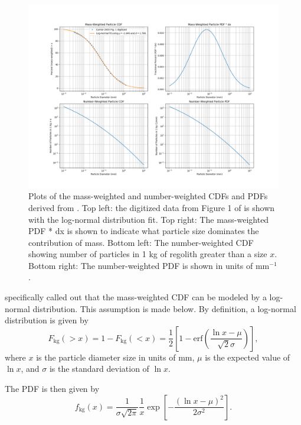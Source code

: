 \documentclass{article}
\begin{document}
\begin{figure}[h!]
	\centering
	\includegraphics[width=1.1\textwidth]{Carrier2003_CDFs_PDFs.png}
	\caption{Plots of the mass-weighted and number-weighted CDFs and PDFs derived from \cite{carrier2003particle}. Top left: the digitized data from Figure 1 of \cite{carrier2003particle} is shown with the log-normal distribution fit. Top right: The mass-weighted PDF * dx is shown to indicate what particle size dominates the contribution of mass. Bottom left: The number-weighted CDF showing number of particles in 1 kg of regolith greater than a size $x$. Bottom right: The number-weighted PDF is shown in units of mm$^{-1}$.}\label{fig:Carrier2003_CDFs_PDFs}
\end{figure}

\cite{carrier2003particle} specifically called out that the mass-weighted CDF can be modeled by a log-normal distribution. This assumption is made below. By definition, a log-normal distribution is given by
\begin{equation}
F_{\text{kg}}(>x) = 1 - F_{\text{kg}}(<x) = \frac{1}{2}\left[1 - \text{erf}\left(\frac{\ln x - \mu}{\sqrt{2}\sigma}\right)\right],
\end{equation}
where $x$ is the particle diameter size in units of mm, $\mu$ is the expected value of $\ln x$, and $\sigma$ is the standard deviation of $\ln x$.

The PDF is then given by
\begin{equation}
f_{\text{kg}}(x) = \frac{1}{\sigma\sqrt{2\pi}}\frac{1}{x}\exp\left[-\frac{(\ln x - \mu)^2}{2\sigma^2}\right].
\end{equation}
\end{document}
